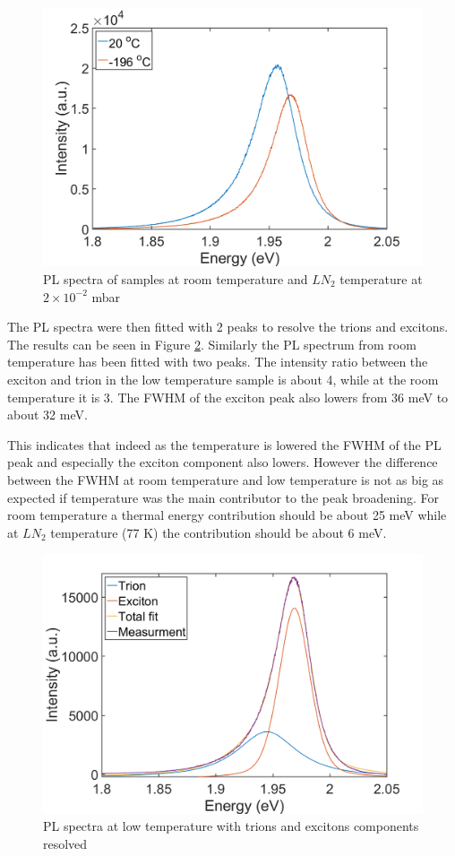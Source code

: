 \begin{figure}[!ht]
	\begin{center}
		\includegraphics[scale=0.4]{LowT/LowTPLComparison.png}
		\caption{PL spectra of samples at room temperature and $LN_2$ temperature at $2 \times 10^{-2}$ mbar}
		\label{fig:LowTPLComparison}
	\end{center}
\end{figure}

The PL spectra were then fitted with 2 peaks to resolve the trions and excitons. The results can be seen in Figure \ref{fig:LowTPLDeconvolution}. Similarly the PL spectrum from room temperature has been fitted with two peaks. The intensity ratio between the exciton and trion in the low temperature sample is about 4, while at the room temperature it is 3. The FWHM of the exciton peak also lowers from 36 meV to about 32 meV.

This indicates that indeed as the temperature is lowered the FWHM of the PL peak and especially the exciton component also lowers. However the difference between the FWHM at room temperature and low temperature is not as big as expected if temperature was the main contributor to the peak broadening. For room temperature a thermal energy contribution should be about 25 meV while at $LN_2$ temperature (77 K) the contribution should be about 6 meV. 

\begin{figure}[!ht]
	\begin{center}
		\includegraphics[scale=0.4]{LowT/LowTPLDeconvolution.png}
		\caption{PL spectra at low temperature with trions and excitons components resolved}
		\label{fig:LowTPLDeconvolution}
	\end{center}
\end{figure}